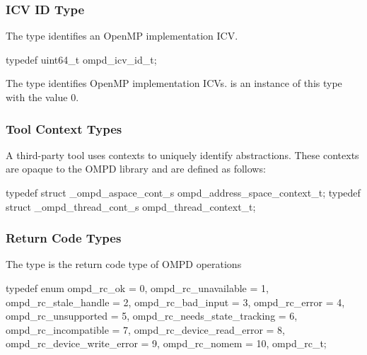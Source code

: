 \subsubsection{ICV ID Type}
\label{subsubsec:ompd_icv_id_t}

\summary
The  type identifies an OpenMP implementation ICV.

\format
\begin{ccppspecific}
\begin{ompSyntax}
typedef uint64_t ompd_icv_id_t;
\end{ompSyntax}
\end{ccppspecific}

The  type identifies OpenMP implementation ICVs.
 is an instance of this type with the value 0.



\subsubsection{Tool Context Types}
\label{subsubsec:ompd_address_space_context_t}
\label{subsubsec:ompd_thread_context_t}

\summary
A third-party tool uses contexts to uniquely identify abstractions. These 
contexts are opaque to the OMPD library and are defined as follows:

\format
\begin{ccppspecific}
\begin{ompSyntax}
typedef struct _ompd_aspace_cont_s ompd_address_space_context_t;
typedef struct _ompd_thread_cont_s ompd_thread_context_t;
\end{ompSyntax}
\end{ccppspecific}



\subsubsection{Return Code Types}
\label{subsubsec:ompd_rc_t}

\summary
The  type is the return code type of OMPD operations

\format
\begin{ccppspecific}
\begin{ompSyntax}
typedef enum {
  ompd_rc_ok = 0,
  ompd_rc_unavailable = 1,
  ompd_rc_stale_handle = 2,
  ompd_rc_bad_input = 3,
  ompd_rc_error = 4,
  ompd_rc_unsupported = 5,
  ompd_rc_needs_state_tracking = 6,
  ompd_rc_incompatible = 7,
  ompd_rc_device_read_error = 8,
  ompd_rc_device_write_error = 9,
  ompd_rc_nomem = 10,
} ompd_rc_t;
\end{ompSyntax}
\end{ccppspecific}


